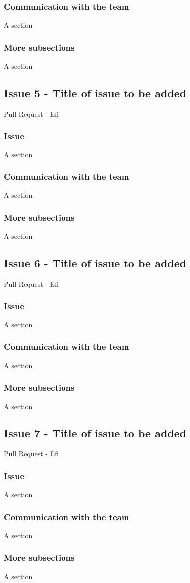 \documentclass{article}
\begin{document}
\subsubsection{Communication with the team}
A section

\subsubsection{More subsections}
A section

\subsection{Issue 5 - Title of issue to be added}
Pull Request - Efi

\subsubsection{Issue}
A section

\subsubsection{Communication with the team}
A section

\subsubsection{More subsections}
A section

\subsection{Issue 6 - Title of issue to be added}
Pull Request - Efi

\subsubsection{Issue}
A section

\subsubsection{Communication with the team}
A section

\subsubsection{More subsections}
A section
\subsection{Issue 7 - Title of issue to be added}
Pull Request - Efi

\subsubsection{Issue}
A section

\subsubsection{Communication with the team}
A section

\subsubsection{More subsections}
A section
\end{document}
